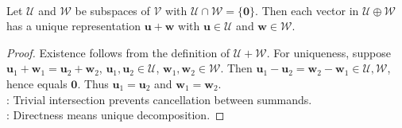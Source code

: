 \begin{proposition} \label{prop:uniqueness-direct-sum-two-subspaces} \\
Let $\mathcal{U}$ and $\mathcal{W}$ be subspaces of $\mathcal{V}$ with $\mathcal{U}\cap\mathcal{W}=\{\mathbf{0}\}$. Then each vector in $\mathcal{U}\oplus\mathcal{W}$ has a unique representation $\mathbf{u}+\mathbf{w}$ with $\mathbf{u}\in\mathcal{U}$ and $\mathbf{w}\in\mathcal{W}$.
\begin{proof}
Existence follows from the definition of $\mathcal{U}+\mathcal{W}$. For uniqueness, suppose $\mathbf{u}_1+\mathbf{w}_1=\mathbf{u}_2+\mathbf{w}_2$, $\mathbf{u}_1,\mathbf{u}_2\in\mathcal{U}$, $\mathbf{w}_1,\mathbf{w}_2\in\mathcal{W}$. Then $\mathbf{u}_1-\mathbf{u}_2=\mathbf{w}_2-\mathbf{w}_1 \in \mathcal{U}, \mathcal{W}$, hence equals $\mathbf{0}$. Thus $\mathbf{u}_1=\mathbf{u}_2$ and $\mathbf{w}_1=\mathbf{w}_2$.\\
: Trivial intersection prevents cancellation between summands.\\
: Directness means unique decomposition.
\end{proof}
\end{proposition}

